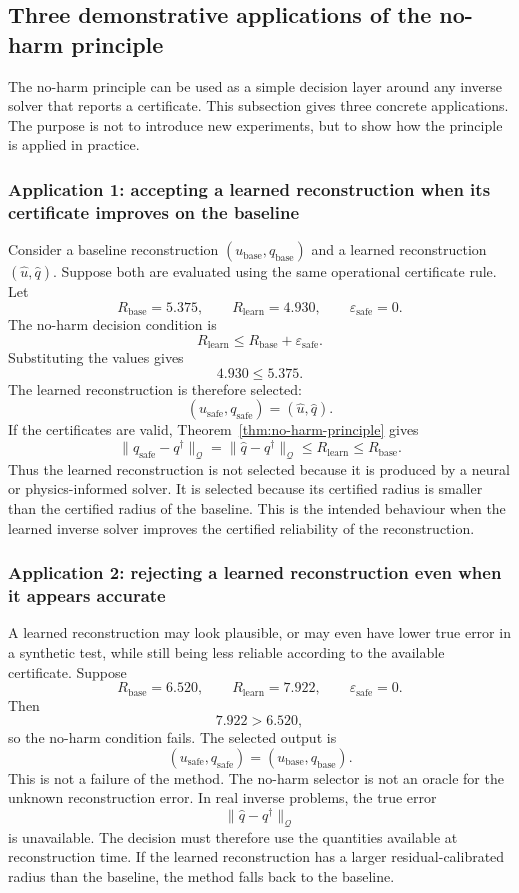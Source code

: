 \documentclass{article}
\numberwithin{equation}{section}
\theoremstyle{definition}
\begin{document}
\subsection{Three demonstrative applications of the no-harm principle}
\label{subsec:no-harm-demonstrative-applications}

The no-harm principle can be used as a simple decision layer around any inverse solver that reports a certificate. This subsection gives three concrete applications. The purpose is not to introduce new experiments, but to show how the principle is applied in practice.

\subsubsection{Application 1: accepting a learned reconstruction when its certificate improves on the baseline}

Consider a baseline reconstruction \((u_{\mathrm{base}},q_{\mathrm{base}})\) and a learned reconstruction \((\widehat u,\widehat q)\). Suppose both are evaluated using the same operational certificate rule. Let
\[
R_{\mathrm{base}}=5.375,
\qquad
R_{\mathrm{learn}}=4.930,
\qquad
\varepsilon_{\mathrm{safe}}=0 .
\]
The no-harm decision condition is
\[
R_{\mathrm{learn}}
\le
R_{\mathrm{base}}+\varepsilon_{\mathrm{safe}} .
\]
Substituting the values gives
\[
4.930 \le 5.375 .
\]
The learned reconstruction is therefore selected:
\[
(u_{\mathrm{safe}},q_{\mathrm{safe}})
=
(\widehat u,\widehat q).
\]
If the certificates are valid, Theorem~\ref{thm:no-harm-principle} gives
\[
\|q_{\mathrm{safe}}-q^\dagger\|_{\mathcal Q}
=
\|\widehat q-q^\dagger\|_{\mathcal Q}
\le
R_{\mathrm{learn}}
\le
R_{\mathrm{base}} .
\]
Thus the learned reconstruction is not selected because it is produced by a neural or physics-informed solver. It is selected because its certified radius is smaller than the certified radius of the baseline. This is the intended behaviour when the learned inverse solver improves the certified reliability of the reconstruction.

\subsubsection{Application 2: rejecting a learned reconstruction even when it appears accurate}

A learned reconstruction may look plausible, or may even have lower true error in a synthetic test, while still being less reliable according to the available certificate. Suppose
\[
R_{\mathrm{base}}=6.520,
\qquad
R_{\mathrm{learn}}=7.922,
\qquad
\varepsilon_{\mathrm{safe}}=0 .
\]
Then
\[
7.922 > 6.520 ,
\]
so the no-harm condition fails. The selected output is
\[
(u_{\mathrm{safe}},q_{\mathrm{safe}})
=
(u_{\mathrm{base}},q_{\mathrm{base}}).
\]
This is not a failure of the method. The no-harm selector is not an oracle for the unknown reconstruction error. In real inverse problems, the true error
\[
\|\widehat q-q^\dagger\|_{\mathcal Q}
\]
is unavailable. The decision must therefore use the quantities available at reconstruction time. If the learned reconstruction has a larger residual-calibrated radius than the baseline, the method falls back to the baseline.
\end{document}

